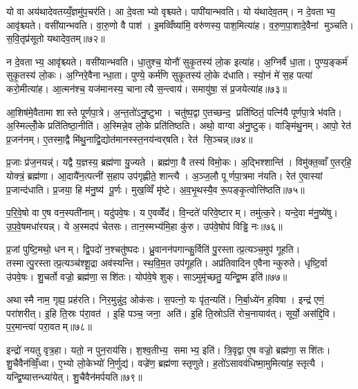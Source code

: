 यो वा अय॑थादेवतय्यँ॒ज्ञमु॑प॒चर॑ति। आ दे॒वताभ्यो वृश्च्यते। पापी॑यान्भवति। यो य॑थादेव॒तम्। न दे॒वताभ्य॒ आवृ॑श्च्यते। वसी॑यान्भवति। वा॒रु॒णो वै पाश॑। इ॒मव्विँष्या॑मि॒ वरु॑णस्य॒ पाश॒मित्या॑ह। व॒रु॒ण॒पा॒शादे॒वैनां मुञ्चति। स॒वि॒तृप्र॑सूतो यथादेव॒तम्॥७२॥

न दे॒वताभ्य॒ आवृ॑श्च्यते। वसी॑यान्भवति। धा॒तुश्च॒ योनौ॑ सुकृ॒तस्य॑ लो॒क इत्या॑ह। अ॒ग्निर्वै धा॒ता। पुण्य॒ङ्कर्म॑ सुकृ॒तस्य॑ लो॒कः। अ॒ग्निरे॒वैनान्धा॒ता। पुण्ये॒ कर्म॑णि सुकृ॒तस्य॑ लो॒के द॑धाति। स्यो॒नं मे॑ स॒ह पत्या॑ करो॒मीत्या॑ह। आ॒त्मन॑श्च॒ यज॑मानस्य॒ चानात्यै स॒न्त्वाय॑। समायु॑षा॒ सं प्र॒जयेत्या॑ह॥७३॥

आ॒शिष॑मे॒वैतामा शास्ते पूर्णपा॒त्रे। अ॒न्त॒तो॑ऽनु॒ष्टुभा। चतु॑ष्प॒द्वा ए॒तच्छन्द॒ प्रति॑ष्ठितं॒ पत्नि॑यै पूर्णपा॒त्रे भ॑वति। अ॒स्मिल्लोँ॒के प्रति॑तिष्ठा॒नीति॑। अ॒स्मिन्ने॒व लो॒के प्रति॑तिष्ठति। अथो॒ वाग्वा अ॑नु॒ष्टुक्। वाङ्मि॑थु॒नम्। आपो॒ रेत॑ प्र॒जन॑नम्। ए॒तस्मा॒द्वै मि॑थु॒नाद्वि॒द्योत॑मानस्स्त॒नय॑न्वर्‌षति। रेत॑ सि॒ञ्चन्न्॥७४॥

प्र॒जाः प्र॑ज॒नयन्न्॑। यद्वै य॒ज्ञस्य॒ ब्रह्म॑णा यु॒ज्यते। ब्रह्म॑णा॒ वै तस्य॑ विमो॒कः। अ॒द्भिश्शान्ति॑। विमु॑क्त॒व्वाँ ए॒तर्‌हि॒ योक्त्रं॒ ब्रह्म॑णा। आ॒दायै॑न॒त्पत्नी॑ स॒हाप उप॑गृह्णीते॒ शान्त्यै। अ॒ञ्ज॒लौ पूर्णपा॒त्रमा न॑यति। रेत॑ ए॒वास्यां प्र॒जान्द॑धाति। प्र॒जया॒ हि म॑नु॒ष्य॑ पू॒र्णः। मुख॒व्विँ मृ॑ष्टे। अ॒व॒भृ॒थस्यै॒व रू॒पङ्कृ॒त्वोत्ति॑ष्ठति॥७५॥\anuvakamend[स॒वि॒तृप्र॑सूतो यथादेव॒तं प्र॒जयेत्या॑ह सि॒ञ्चन्मृ॑ष्ट॒ एक॑ञ्च]

प॒रि॒वे॒षो वा ए॒ष वन॒स्पती॑नाम्। यदु॑पवे॒षः। य ए॒वव्वेँद॑। वि॒न्दते॑ परिवे॒ष्टारम्। तमु॑त्क॒रे। यन्दे॒वा म॑नु॒ष्ये॑षु। उ॒प॒वे॒षमधा॑रयन्न्। ये अ॒स्मदप॑ चेतसः। तान॒स्मभ्य॑मि॒हा कु॑रु। उप॑वे॒षोप॑ विड्ढि नः॥७६॥

प्र॒जां पुष्टि॒मथो॒ धनम्। द्वि॒पदो॑ न॒श्चतु॑ष्पदः। ध्रु॒वानन॑पगान्कु॒र्विति॑ पु॒रस्तात्प्र॒त्यञ्च॒मुप॑ गूहति। तस्मात्पु॒रस्तात्प्र॒त्यञ्च॑श्शू॒द्रा अव॑स्यन्ति। स्थ॒वि॒म॒त उप॑गूहति। अप्र॑तिवादिन ए॒वैनान्कुरुते। धृष्टि॒र्वा उ॑पवे॒षः। शु॒चर्तो वज्रो॒ ब्रह्म॑णा॒ सशि॑तः। योप॑वे॒षे शुक्। साऽमुमृ॑च्छतु॒ यन्द्वि॒ष्म इति॑॥७७॥

अथास्मै नाम॒ गृह्य॒ प्रह॑रति। निर॒मुन्नु॑द॒ ओक॑सः। स॒पत्नो॒ यः पृ॑त॒न्यति॑। नि॒र्बा॒ध्ये॑न ह॒विषा। इन्द्र॑ एणं॒ परा॑शरीत्। इ॒हि ति॒स्रः प॑रा॒वत॑। इ॒हि पञ्च॒ जना॒ अति॑। इ॒हि ति॒स्रोऽति॑ रोच॒नायाव॑त्। सूर्यो॒ अस॑द्दि॒वि। प॒र॒मान्त्वा॑ परा॒वतम्॥७८॥

इन्द्रो॑ नयतु वृत्र॒हा। यतो॒ न पुन॒राय॑सि। श॒श्व॒तीभ्य॒ समाभ्य॒ इति॑। त्रि॒वृद्वा ए॒ष वज्रो॒ ब्रह्म॑णा॒ सशि॑तः। शु॒चैवैन॑व्विँ॒ध्वा। ए॒भ्यो लो॒केभ्यो॑ नि॒र्णुद्य॑। वज्रे॑ण॒ ब्रह्म॑णा स्तृणुते। ह॒तो॑ऽसावव॑धिष्मा॒मुमित्या॑ह॒ स्तृत्यै। यन्द्वि॒ष्यात्तन्ध्या॑येत्। शु॒चैवैन॑मर्पयति॥७९॥

